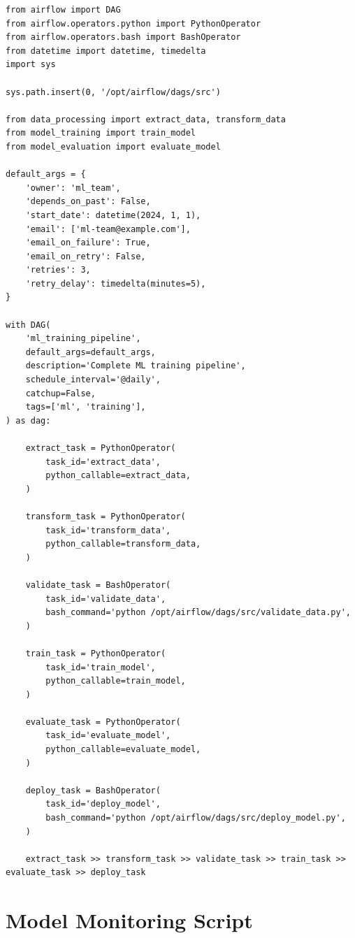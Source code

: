 \begin{lstlisting}[style=python, caption=ml\_dag.py]
from airflow import DAG
from airflow.operators.python import PythonOperator
from airflow.operators.bash import BashOperator
from datetime import datetime, timedelta
import sys

sys.path.insert(0, '/opt/airflow/dags/src')

from data_processing import extract_data, transform_data
from model_training import train_model
from model_evaluation import evaluate_model

default_args = {
    'owner': 'ml_team',
    'depends_on_past': False,
    'start_date': datetime(2024, 1, 1),
    'email': ['ml-team@example.com'],
    'email_on_failure': True,
    'email_on_retry': False,
    'retries': 3,
    'retry_delay': timedelta(minutes=5),
}

with DAG(
    'ml_training_pipeline',
    default_args=default_args,
    description='Complete ML training pipeline',
    schedule_interval='@daily',
    catchup=False,
    tags=['ml', 'training'],
) as dag:

    extract_task = PythonOperator(
        task_id='extract_data',
        python_callable=extract_data,
    )

    transform_task = PythonOperator(
        task_id='transform_data',
        python_callable=transform_data,
    )

    validate_task = BashOperator(
        task_id='validate_data',
        bash_command='python /opt/airflow/dags/src/validate_data.py',
    )

    train_task = PythonOperator(
        task_id='train_model',
        python_callable=train_model,
    )

    evaluate_task = PythonOperator(
        task_id='evaluate_model',
        python_callable=evaluate_model,
    )

    deploy_task = BashOperator(
        task_id='deploy_model',
        bash_command='python /opt/airflow/dags/src/deploy_model.py',
    )

    extract_task >> transform_task >> validate_task >> train_task >> evaluate_task >> deploy_task
\end{lstlisting}

\section{Model Monitoring Script}

